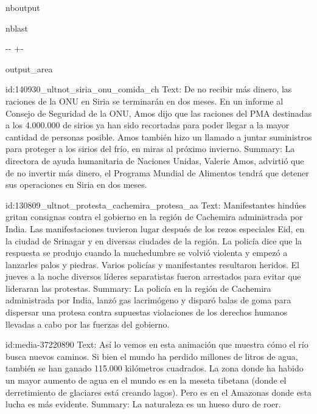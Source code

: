 \documentclass[letterpaper,10pt,english]{sphinxmanual}
\newlength\nbsphinxcodecellspacing
\begin{document}
\begin{sphinxuseclass}{nboutput}
\begin{sphinxuseclass}{nblast}
{

\kern-\sphinxverbatimsmallskipamount\kern-\baselineskip
\kern+\FrameHeightAdjust\kern-\fboxrule
\vspace{\nbsphinxcodecellspacing}

\begin{sphinxuseclass}{output_area}
\begin{sphinxuseclass}{}


\begin{sphinxVerbatim}[commandchars=\\\{\}]
id:140930\_ultnot\_siria\_onu\_comida\_ch
Text: De no recibir más dinero, las raciones de la ONU en Siria se terminarán en dos meses. En un informe al Consejo de Seguridad de la ONU, Amos dijo que las raciones del PMA destinadas a los 4.000.000 de sirios ya han sido recortadas para poder llegar a la mayor cantidad de personas posible. Amos también hizo un llamado a juntar suministros para proteger a los sirios del frío, en miras al próximo invierno.
Summary: La directora de ayuda humanitaria de Naciones Unidas, Valerie Amos, advirtió que de no invertir más dinero, el Programa Mundial de Alimentos tendrá que detener sus operaciones en Siria en dos meses.

id:130809\_ultnot\_protesta\_cachemira\_protesa\_aa
Text: Manifestantes hindúes gritan consignas contra el gobierno en la región de Cachemira administrada por India. Las manifestaciones tuvieron lugar después de los rezos especiales Eid, en la ciudad de Srinagar y en diversas ciudades de la región. La policía dice que la respuesta se produjo cuando la muchedumbre se volvió violenta y empezó a lanzarles palos y piedras. Varios policías y manifestantes resultaron heridos. El jueves a la noche diversos líderes separatistas fueron arrestados para evitar que lideraran las protestas.
Summary: La policía en la región de Cachemira administrada por India, lanzó gas lacrimógeno y disparó balas de goma para dispersar una protesa contra supuestas violaciones de los derechos humanos llevadas a cabo por las fuerzas del gobierno.

id:media-37220890
Text: Así lo vemos en esta animación que muestra cómo el río busca nuevos caminos. Si bien el mundo ha perdido millones de litros de agua, también se han ganado 115.000 kilómetros cuadrados. La zona donde ha habido un mayor aumento de agua en el mundo es en la meseta tibetana (donde el derretimiento de glaciares está creando lagos). Pero es en el Amazonas donde esta lucha es más evidente.
Summary: La naturaleza es un hueso duro de roer.

\end{sphinxVerbatim}



\end{sphinxuseclass}
\end{sphinxuseclass}
}

\end{sphinxuseclass}
\end{sphinxuseclass}
\end{document}
